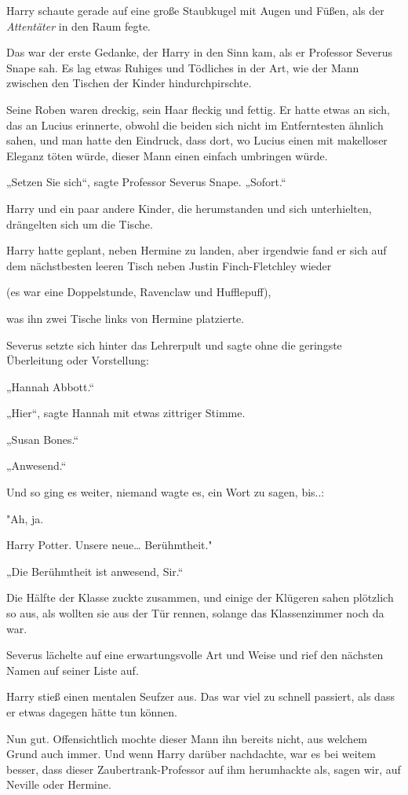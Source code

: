 {Harry schaute gerade auf eine große Staubkugel mit Augen und Füßen, als der \emph{Attentäter} in den Raum fegte.

Das war der erste Gedanke, der Harry in den Sinn kam, als er Professor Severus Snape sah. Es lag etwas Ruhiges und Tödliches in der Art, wie der Mann zwischen den Tischen der Kinder hindurchpirschte.

Seine Roben waren dreckig, sein Haar fleckig und fettig. Er hatte etwas an sich, das an Lucius erinnerte, obwohl die beiden sich nicht im Entferntesten ähnlich sahen, und man hatte den Eindruck, dass dort, wo Lucius einen mit makelloser Eleganz töten würde, dieser Mann einen einfach umbringen würde.

„Setzen Sie sich“, sagte Professor Severus Snape. „Sofort.“

Harry und ein paar andere Kinder, die herumstanden und sich unterhielten, drängelten sich um die Tische.

Harry hatte geplant, neben Hermine zu landen, aber irgendwie fand er sich auf dem nächstbesten leeren Tisch neben Justin Finch-Fletchley wieder

(es war eine Doppelstunde, Ravenclaw und Hufflepuff),

was ihn zwei Tische links von Hermine platzierte.

Severus setzte sich hinter das Lehrerpult und sagte ohne die geringste Überleitung oder Vorstellung:

„Hannah Abbott.“

„Hier“, sagte Hannah mit etwas zittriger Stimme.

„Susan Bones.“

„Anwesend.“

Und so ging es weiter, niemand wagte es, ein Wort zu sagen, bis..:

"Ah, ja.

Harry Potter. Unsere neue… Berühmtheit."

„Die Berühmtheit ist anwesend, Sir.“

Die Hälfte der Klasse zuckte zusammen, und einige der Klügeren sahen plötzlich so aus, als wollten sie aus der Tür rennen, solange das Klassenzimmer noch da war.

Severus lächelte auf eine erwartungsvolle Art und Weise und rief den nächsten Namen auf seiner Liste auf.

Harry stieß einen mentalen Seufzer aus. Das war viel zu schnell passiert, als dass er etwas dagegen hätte tun können.

Nun gut. Offensichtlich mochte dieser Mann ihn bereits nicht, aus welchem Grund auch immer. Und wenn Harry darüber nachdachte, war es bei weitem besser, dass dieser Zaubertrank-Professor auf ihm herumhackte als, sagen wir, auf Neville oder Hermine.

}
